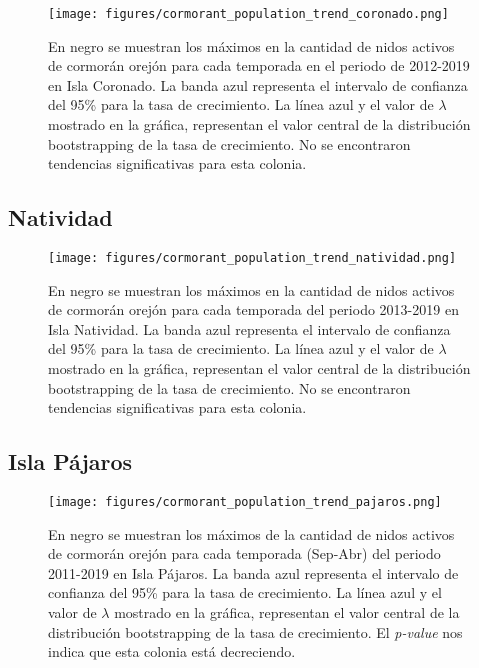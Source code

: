 \documentclass{article} %
\begin{document}
\begin{figure}[H]
\hspace{-2cm}
    \texttt{[image: figures/cormorant\_population\_trend\_coronado.png]}
\caption{En negro se muestran los máximos en la cantidad de nidos activos de cormorán orejón para cada temporada en el periodo de 2012-2019 en Isla Coronado. La banda azul representa el intervalo de confianza del 95\% para la tasa de crecimiento. La línea azul y el valor de $\lambda$ mostrado en la gráfica, representan el valor central de la distribución bootstrapping de la tasa de crecimiento. No se encontraron tendencias significativas para esta colonia.}
\end{figure}

\subsection*{Natividad}

\begin{figure}[H]
\hspace{-2cm}
    \texttt{[image: figures/cormorant\_population\_trend\_natividad.png]}
\caption{En negro se muestran los máximos en la cantidad de nidos activos de cormorán orejón para cada temporada del periodo 2013-2019 en Isla Natividad. La banda azul representa el intervalo de confianza del 95\% para la tasa de crecimiento. La línea azul y el valor de $\lambda$ mostrado en la gráfica, representan el valor central de la distribución bootstrapping de la tasa de crecimiento. No se encontraron tendencias significativas para esta colonia.}
\end{figure}

\subsection*{Isla Pájaros}

\begin{figure}[H]
\hspace{-2cm}
    \texttt{[image: figures/cormorant\_population\_trend\_pajaros.png]}
\caption{En negro se muestran los máximos de la cantidad de nidos activos de cormorán orejón para cada temporada (Sep-Abr) del periodo 2011-2019 en Isla Pájaros. La banda azul representa el intervalo de confianza del 95\% para la tasa de crecimiento. La línea azul y el valor de $\lambda$ mostrado en la gráfica, representan el valor central de la distribución bootstrapping de la tasa de crecimiento. El \textit{p-value} nos indica que esta colonia está decreciendo.}
\end{figure}
\end{document}
